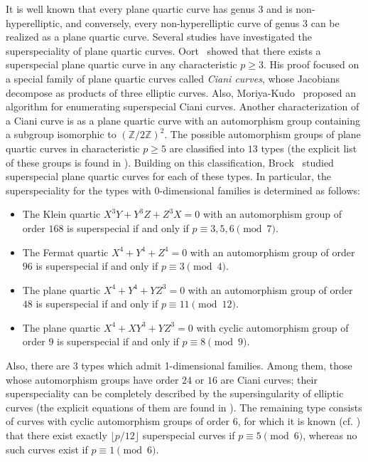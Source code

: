 \documentclass[10pt,a4paper]{amsart}
\begin{document}
It is well known that every plane quartic curve has genus $3$ and is non-hyperelliptic, and conversely, every non-hyperelliptic curve of genus $3$ can be realized as a plane quartic curve.
Several studies have investigated the superspeciality of plane quartic curves.
Oort~\cite[Theorem 5.12(1)]{Oort} showed that there exists a superspecial plane quartic curve in any characteristic $p \geq 3$.
His proof focused on a special family of plane quartic curves called \hspace{-0.2mm}\emph{Ciani curves}, whose Jacobians decompose as products of three elliptic curves.
Also, Moriya-Kudo~\cite{MK} proposed an algorithm for enumerating superspecial Ciani curves.
Another characterization of a Ciani curve is as a plane quartic curve with an automorphism group containing a subgroup isomorphic to $(\mathbb{Z}/2\mathbb{Z})^2$.
The possible automorphism groups of plane quartic curves in characteristic $p \geq 5$ are classified into $13$ types (the explicit list of these groups is found in \cite[Theorem 6.5.2]{Dolgachev}).
Building on this classification, Brock~\cite{Brock} studied superspecial plane quartic curves for each of these types. %
In particular, the superspeciality for the types with $0$-dimensional families is determined as follows:\vspace{-0.4mm}
\begin{itemize}
    \item The Klein quartic $X^3Y+Y^3Z+Z^3X = 0$ with an automorphism group of order $168$ is superspecial if and only if $p \equiv 3,5,6 \pmod{7}$.\vspace{-0.8mm}
    \item The Fermat quartic $X^4+Y^4+Z^4 = 0$ with an automorphism group of order $96$ is superspecial if and only if $p \equiv 3 \pmod{4}$.\vspace{-0.8mm}
    \item The plane quartic $X^4+Y^4+YZ^3 = 0$ with an automorphism group of order $48$ is superspecial if and only if $p \equiv 11 \pmod{12}$.\vspace{-0.8mm}
    \item The plane quartic $X^4+XY^3+YZ^3 = 0$ with cyclic automorphism group of order $9$ is superspecial if and only if $p \equiv 8 \pmod{9}$.\vspace{0.4mm}
\end{itemize}
Also, there are $3$ types which admit 1-dimensional families.
Among them, those whose automorphism groups have order $24$ or $16$ are Ciani curves; \hspace{0.5mm}their superspeciality can be completely described by the supersingularity of elliptic curves (the explicit equations of them are found in \cite[Sections 4--5]{MS}).
The remaining type consists of curves with cyclic automorphism groups of order $6$, for which it is known (cf. \cite{OKH}) that there exist exactly $\lfloor p/12 \rfloor$ superspecial curves if $p \equiv 5 \pmod{6}$, whereas no such curves exist if $p \equiv 1 \pmod{6}$.
\end{document}
